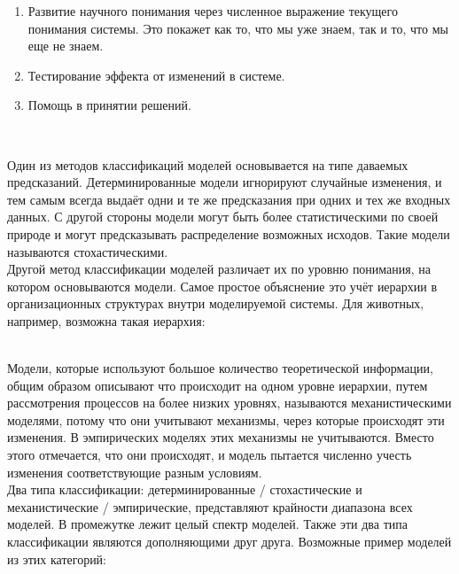 \begin{enumerate}
  \item Развитие научного понимания через численное выражение текущего понимания системы. Это покажет как то, что мы уже знаем, так и то, что мы еще не знаем.
  \item Тестирование эффекта от изменений в системе.
  \item Помощь в принятии решений.
\end{enumerate}
\

Один из методов классификаций моделей основывается на типе даваемых предсказаний. Детерминированные модели игнорируют случайные изменения, и тем самым всегда выдаёт одни и те же предсказания при одних и тех же входных данных. С другой стороны модели могут быть более статистическими по своей природе и могут предсказывать распределение возможных исходов. Такие модели называются стохастическими. \\

Другой метод классификации моделей различает их по уровню понимания, на котором основываются модели. Самое простое объяснение это учёт иерархии в организационных структурах внутри моделируемой системы. Для животных, например, возможна такая иерархия: \\

\

Модели, которые используют большое количество теоретической информации, общим образом описывают что происходит на одном уровне иерархии, путем рассмотрения процессов на более низких уровнях, называются механистическими моделями, потому что они учитывают механизмы, через которые происходят эти изменения. В эмпирических моделях этих механизмы не учитываются. Вместо этого отмечается, что они происходят, и модель пытается численно учесть изменения соответствующие разным условиям. \\

Два типа классификации: детерминированные / стохастические и механистические / эмпирические, представляют крайности диапазона всех моделей. В промежутке лежит целый спектр моделей. Также эти два типа классификации являются дополняющими друг друга. Возможные пример моделей из этих категорий: \\

